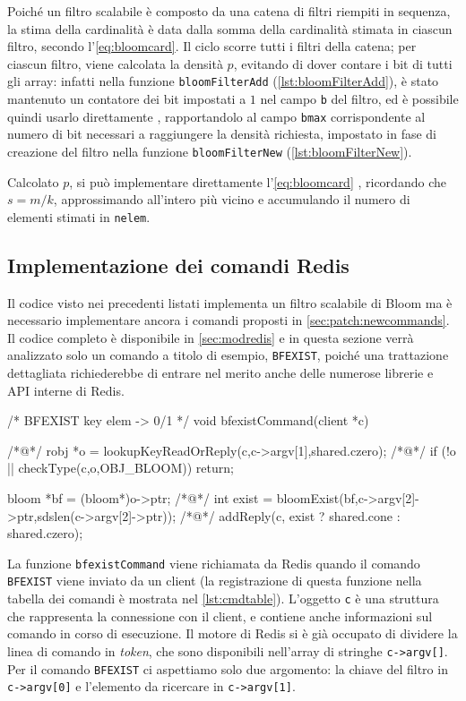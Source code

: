 Poiché un filtro scalabile è composto da una catena di filtri riempiti in sequenza, la stima
della cardinalità è data dalla somma della cardinalità stimata in ciascun filtro, secondo 
l'\autoref{eq:bloomcard}. Il ciclo  scorre tutti i filtri della catena; per ciascun
filtro, viene calcolata la densità $p$, evitando di dover contare i bit di tutti gli array: infatti
nella funzione \verb|bloomFilterAdd| (\autoref{lst:bloomFilterAdd}), è stato mantenuto un contatore
dei bit impostati a $1$ nel campo \verb|b| del filtro, ed è possibile quindi usarlo direttamente
, rapportandolo al campo \verb|bmax| corrispondente al numero di bit necessari a
raggiungere la densità richiesta, impostato in fase di creazione del filtro nella funzione
\verb|bloomFilterNew| (\autoref{lst:bloomFilterNew}). 

Calcolato $p$, si può implementare direttamente l'\autoref{eq:bloomcard} , ricordando che
$s = m/k$, approssimando all'intero più vicino e accumulando il numero di elementi stimati in
\verb|nelem|.

\subsection{Implementazione dei comandi Redis}

Il codice visto nei precedenti listati implementa un filtro scalabile di Bloom ma è necessario
implementare ancora i comandi proposti in \autoref{sec:patch:newcommands}. Il codice completo è
disponibile in \autoref{sec:modredis} e in questa sezione verrà analizzato solo un comando a titolo
di esempio, \verb|BFEXIST|, poiché una trattazione dettagliata richiederebbe di entrare nel merito
anche delle numerose librerie e API interne di Redis.

\begin{commentedsource}[style=csource,caption=Implementazione comando BFEXIST,label={lst:bfexistCommand}]
/* BFEXIST key elem -> 0/1 */
void bfexistCommand(client *c) {
/*@\lnote@*/    robj *o = lookupKeyReadOrReply(c,c->argv[1],shared.czero);
/*@\lnote@*/    if (!o || checkType(c,o,OBJ_BLOOM)) {
        return;
    }

    bloom *bf = (bloom*)o->ptr;
/*@\lnote@*/    int exist = bloomExist(bf,c->argv[2]->ptr,sdslen(c->argv[2]->ptr));
/*@\lnote@*/    addReply(c, exist ? shared.cone : shared.czero);
}
\end{commentedsource}

La funzione \verb|bfexistCommand| viene richiamata da Redis quando il comando \verb|BFEXIST| viene
inviato da un client (la registrazione di questa funzione nella tabella dei comandi è mostrata nel
\autoref{lst:cmdtable}). L'oggetto \verb|c| è una struttura che rappresenta la connessione con il
client, e contiene anche informazioni sul comando in corso di esecuzione. Il motore di Redis si è
già occupato di dividere la linea di comando in \emph{token}, che sono disponibili nell'array di
stringhe \verb|c->argv[]|. Per il comando \verb|BFEXIST| ci aspettiamo solo due argomento: la chiave
del filtro in \verb|c->argv[0]| e l'elemento da ricercare in \verb|c->argv[1]|.


